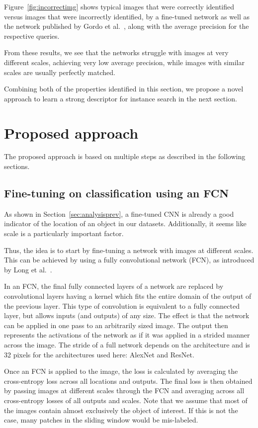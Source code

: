 Figure~\ref{fig:incorrectimg}
shows typical images that were correctly identified versus images that
were incorrectly identified, by a fine-tuned network as well as the network
published by Gordo et al.~\cite{gordo_deep_2016}, along with the average
precision for the respective queries.

From these results, we see that the networks struggle with images at
very different scales, achieving very low average precision,
while images with similar scales are usually perfectly matched.

Combining both of the properties identified in this section, we
propose a novel approach to learn a strong descriptor for instance
search in the next section.

\section{Proposed approach}\label{sec:proposed}
The proposed approach is based on multiple steps as described in the
following sections.

\subsection{Fine-tuning on classification using an FCN}\label{sec:fcnfinetune}
As shown in Section~\ref{sec:analysisprev}, a fine-tuned CNN is already
a good indicator of the location of an object in our datasets.
Additionally, it seems like scale is a particularly important factor.

Thus, the idea is to start by fine-tuning a network with images
at different scales. This can be achieved by using a fully
convolutional network (FCN), as introduced by
Long et al.~\cite{long_fully_2015}.

In an FCN, the final fully connected layers
of a network are replaced by convolutional layers having a kernel
which fits the entire domain of the output of the previous layer.
This type of convolution is equivalent to a fully connected layer,
but allows inputs (and outputs) of any size.
The effect is that the network can be applied in one pass to an
arbitrarily sized image. The output then represents the activations
of the network as if it was applied in a strided manner across the image.
The stride of a full network depends on the architecture and is 32
pixels for the architectures used here: AlexNet and ResNet.

Once an FCN is applied to the image, the loss
is calculated by averaging the cross-entropy loss across all locations
and outputs.
The final loss is then obtained by passing images at different scales
through the FCN and averaging across all cross-entropy losses of all
outputs and scales. Note that we assume that most of the images contain
almost exclusively the object of interest. If this is not the case, many
patches in the sliding window would be mis-labeled.

